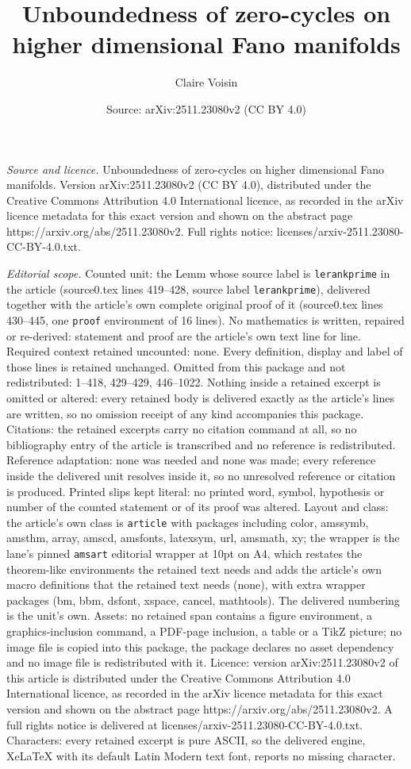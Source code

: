 \documentclass[10pt,a4paper]{amsart}
\title[Unboundedness of zero-cycles on higher dimensional Fano mani]{Unboundedness of zero-cycles on higher dimensional Fano manifolds}
\author{Claire Voisin}
\date{Source: arXiv:2511.23080v2 (CC BY 4.0)}
\begin{document}
\maketitle

\noindent\emph{Source and licence.} Unboundedness of zero-cycles on higher dimensional Fano manifolds. Version arXiv:2511.23080v2 (CC BY 4.0), distributed under the Creative Commons Attribution 4.0 International licence, as recorded in the arXiv licence metadata for this exact version and shown on the abstract page https://arxiv.org/abs/2511.23080v2. Full rights notice: licenses/arxiv-2511.23080-CC-BY-4.0.txt.\par\smallskip

\noindent\textit{Editorial scope.} Counted unit: the Lemm whose source label is \texttt{lerankprime} in the article (source0.tex lines 419--428, source label \texttt{lerankprime}), delivered together with the article's own complete original proof of it (source0.tex lines 430--445, one \texttt{proof} environment of 16 lines). No mathematics is written, repaired or re-derived: statement and proof are the article's own text line for line. Required context retained uncounted: none. Every definition, display and label of those lines is retained unchanged. Omitted from this package and not redistributed: 1--418, 429--429, 446--1022. Nothing inside a retained excerpt is omitted or altered: every retained body is delivered exactly as the article's lines are written, so no omission receipt of any kind accompanies this package. Citations: the retained excerpts carry no citation command at all, so no bibliography entry of the article is transcribed and no reference is redistributed. Reference adaptation: none was needed and none was made; every reference inside the delivered unit resolves inside it, so no unresolved reference or citation is produced. Printed slips kept literal: no printed word, symbol, hypothesis or number of the counted statement or of its proof was altered. Layout and class: the article's own class is \texttt{article} with packages including color, amssymb, amsthm, array, amscd, amsfonts, latexsym, url, amsmath, xy; the wrapper is the lane's pinned \texttt{amsart} editorial wrapper at 10pt on A4, which restates the theorem-like environments the retained text needs and adds the article's own macro definitions that the retained text needs (none), with extra wrapper packages (bm, bbm, dsfont, xspace, cancel, mathtools). The delivered numbering is the unit's own. Assets: no retained span contains a figure environment, a graphics-inclusion command, a PDF-page inclusion, a table or a TikZ picture; no image file is copied into this package, the package declares no asset dependency and no image file is redistributed with it. Licence: version arXiv:2511.23080v2 of this article is distributed under the Creative Commons Attribution 4.0 International licence, as recorded in the arXiv licence metadata for this exact version and shown on the abstract page https://arxiv.org/abs/2511.23080v2. A full rights notice is delivered at licenses/arxiv-2511.23080-CC-BY-4.0.txt. Characters: every retained excerpt is pure ASCII, so the delivered engine, XeLaTeX with its default Latin Modern text font, reports no missing character.
\end{document}
